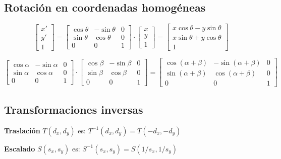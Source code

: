 \subsection{Rotación en coordenadas homogéneas}
$$\left[\begin{matrix}
x' \\ y' \\ 1
\end{matrix}\right] =
\left[\begin{matrix}
\cos \theta & - \sin \theta & 0 \\ \sin \theta & \cos \theta & 0 \\ 0 & 0 & 1
\end{matrix}\right] \cdot
\left[\begin{matrix}
x \\ y \\ 1
\end{matrix}\right]=
\left[\begin{matrix}
x \cos \theta - y \sin \theta \\ x \sin \theta + y \cos \theta \\ 1
\end{matrix}\right]$$

$$\left[\begin{matrix}
\cos \alpha & - \sin \alpha & 0 \\ \sin \alpha & \cos \alpha & 0 \\ 0 & 0 & 1
\end{matrix}\right] \cdot
\left[\begin{matrix}
\cos \beta & - \sin \beta & 0 \\ \sin \beta & \cos \beta & 0 \\ 0 & 0 & 1
\end{matrix}\right]=
\left[\begin{matrix}
\cos (\alpha + \beta ) & - \sin (\alpha + \beta ) & 0 \\ \sin (\alpha + \beta ) & \cos (\alpha + \beta ) & 0 \\ 0 & 0 & 1
\end{matrix}\right]$$

\subsection{Transformaciones inversas}
\textbf{Traslación} $T( d_x, d_y)$ es: $T^{-1} ( d_x , d_y ) = T( -d_x , -d_y )$

\textbf{Escalado} $S( s_x , s_y )$ es: $S^{-1} ( s_x , s_y ) = S(1/s_x ,1/s_y )$

